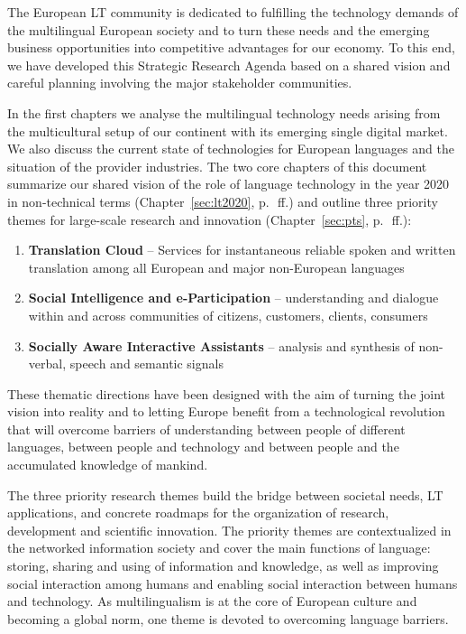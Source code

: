 \documentclass[10pt, plain]{../../metanetpaper}
\begin{document}
\begin{multicols}{2}

The European LT community is dedicated to fulfilling the technology demands of the multilingual European society and to turn these needs and the emerging business opportunities into competitive advantages for our economy. To this end, we have developed this Strategic Research Agenda based on a shared vision and careful planning involving the major stakeholder communities.

In the first chapters we analyse the multilingual technology needs arising from the multicultural setup of our continent with its emerging single digital market. We also discuss the current state of technologies for European languages and the situation of the provider industries. The two core chapters of this document summarize our shared vision of the role of language technology in the year 2020 in non-technical terms (Chapter~\ref{sec:lt2020}, p.~\pageref{sec:lt2020}\,ff.) and outline three priority themes for large-scale research and innovation (Chapter~\ref{sec:pts}, p.~\pageref{sec:pts}\,ff.):

\begin{enumerate}
\item \textbf{Translation Cloud} -- Services for instantaneous reliable spoken and written translation among all European and major non-European languages
\item \textbf{Social Intelligence and e-Participation} -- understanding and dialogue within and across communities of citizens, customers, clients, consumers
\item \textbf{Socially Aware Interactive Assistants} -- analysis and synthesis of non-verbal, speech and semantic signals
\end{enumerate}
 
These thematic directions have been designed with the aim of turning the joint vision into reality and to letting Europe benefit from a technological revolution that will overcome barriers of understanding between people of different languages, between people and technology and between people and the accumulated knowledge of mankind.

The three priority research themes build the bridge between societal needs, LT applications, and concrete roadmaps for the organization of research, development and scientific innovation. The priority themes are contextualized in the networked information society and cover the main functions of language: storing, sharing and using of information and knowledge, as well as improving social interaction among humans and enabling social interaction between humans and technology. As multilingualism is at the core of European culture and becoming a global norm, one theme is devoted to overcoming language barriers.


\end{multicols}
\end{document}
